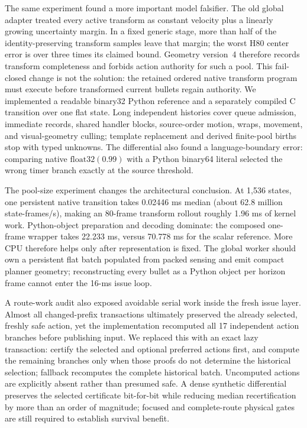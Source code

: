 \documentclass[10pt]{article}
\begin{document}
The same experiment found a more important model falsifier.  The old global
adapter treated every active transform as constant velocity plus a linearly
growing uncertainty margin.  In a fixed generic stage, more than half of the
identity-preserving transform samples leave that margin; the worst H80 center
error is over three times its claimed bound.  Geometry version~4 therefore
records transform completeness and forbids action authority for such a pool.
This fail-closed change is not the solution: the retained ordered native
transform program must execute before transformed current bullets regain
authority.  We implemented a readable binary32 Python reference and a
separately compiled C transition over one flat state.  Long independent
histories cover queue admission, immediate records, shared handler blocks,
source-order motion, wraps, movement, and visual-geometry culling; template
replacement and derived finite-pool births stop with typed unknowns.  The
differential also found a language-boundary error: comparing native
$\mathrm{float32}(0.99)$ with a Python binary64 literal selected the wrong
timer branch exactly at the source threshold.

The pool-size experiment changes the architectural conclusion.  At 1,536
states, one persistent native transition takes 0.02446 ms median (about
62.8 million state-frames/s), making an 80-frame transform rollout roughly
1.96 ms of kernel work.  Python-object preparation and decoding dominate:
the composed one-frame wrapper takes 22.233 ms, versus 70.778 ms for the
scalar reference.  More CPU therefore helps only after representation is
fixed.  The global worker should own a persistent flat batch populated from
packed sensing and emit compact planner geometry; reconstructing every bullet
as a Python object per horizon frame cannot enter the 16-ms issue loop.

A route-work audit also exposed avoidable serial work inside the fresh issue
layer.  Almost all changed-prefix transactions ultimately preserved the
already selected, freshly safe action, yet the implementation recomputed all
17 independent action branches before publishing input.  We replaced this
with an exact lazy transaction: certify the selected and optional preferred
actions first, and compute the remaining branches only when those proofs do
not determine the historical selection; fallback recomputes the complete
historical batch.  Uncomputed actions are explicitly
absent rather than presumed safe.  A dense synthetic differential preserves
the selected certificate bit-for-bit while reducing median recertification by
more than an order of magnitude; focused and complete-route physical gates are
still required to establish survival benefit.
\end{document}
